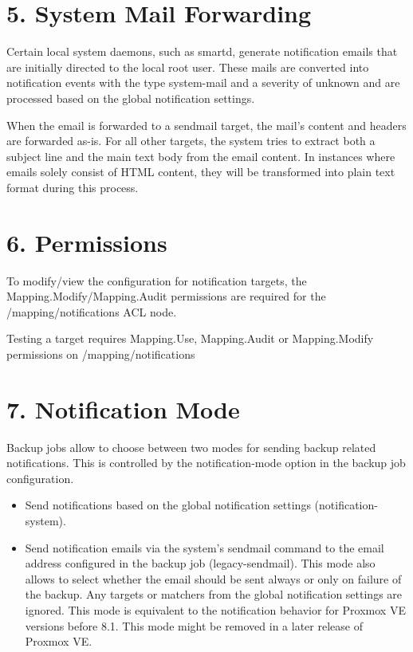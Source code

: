 \section{5. System Mail Forwarding}

Certain local system daemons, such as smartd, generate notification emails that are initially directed to the local root user. These mails are converted into notification events with the type system-mail and a severity of unknown and are processed based on the global notification settings.

When the email is forwarded to a sendmail target, the mail’s content and headers are forwarded as-is. For all other targets, the system tries to extract both a subject line and the main text body from the email content. In instances where emails solely consist of HTML content, they will be transformed into plain text format during this process.


\section{6. Permissions}

To modify/view the configuration for notification targets, the Mapping.Modify/Mapping.Audit permissions are required for the /mapping/notifications ACL node.

Testing a target requires Mapping.Use, Mapping.Audit or Mapping.Modify permissions on /mapping/notifications


\section{7. Notification Mode}

Backup jobs allow to choose between two modes for sending backup related notifications. This is controlled by the notification-mode option in the backup job configuration.

\begin{itemize}[leftmargin=2cm]

	\item Send notifications based on the global notification settings (notification-system).

	\item Send notification emails via the system’s sendmail command to the email address configured in the backup job (legacy-sendmail). This mode also allows to select whether the email should be sent always or only on failure of the backup. Any targets or matchers from the global notification settings are ignored. This mode is equivalent to the notification behavior for Proxmox VE versions before 8.1. This mode might be removed in a later release of Proxmox VE.

\end{itemize}


